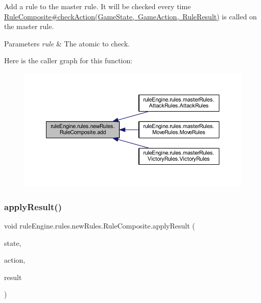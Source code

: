 Add a rule to the master rule. It will be checked every time \mbox{\hyperlink{classrule_engine_1_1rules_1_1new_rules_1_1_rule_composite_ab6815980fba07e2757c007ab2a819b8d}{Rule\+Composite\#check\+Action(\+Game\+State, Game\+Action, Rule\+Result)}} is called on the master rule.


\begin{DoxyParams}{Parameters}
{\em rule} & The atomic to check. \\
\hline
\end{DoxyParams}
Here is the caller graph for this function\+:
\nopagebreak
\begin{figure}[H]
\begin{center}
\leavevmode
\includegraphics[width=350pt]{classrule_engine_1_1rules_1_1new_rules_1_1_rule_composite_a4970c2904b55542c6c7323195a38c845_icgraph}
\end{center}
\end{figure}
\mbox{\label{classrule_engine_1_1rules_1_1new_rules_1_1_rule_composite_a1b548eb3e8f7cf70b736e552f3ae54a2}} 
\subsubsection{\texorpdfstring{apply\+Result()}{applyResult()}}
{\footnotesize\ttfamily void rule\+Engine.\+rules.\+new\+Rules.\+Rule\+Composite.\+apply\+Result (\begin{DoxyParamCaption}\item[{\mbox{\hyperlink{classgame_1_1game_state_1_1_game_state}{Game\+State}}}]{state,  }\item[{\mbox{\hyperlink{classrule_engine_1_1_game_action}{Game\+Action}}}]{action,  }\item[{\mbox{\hyperlink{classrule_engine_1_1_rule_result}{Rule\+Result}}}]{result }\end{DoxyParamCaption})\hspace{0.3cm}{\ttfamily [inline]}}

